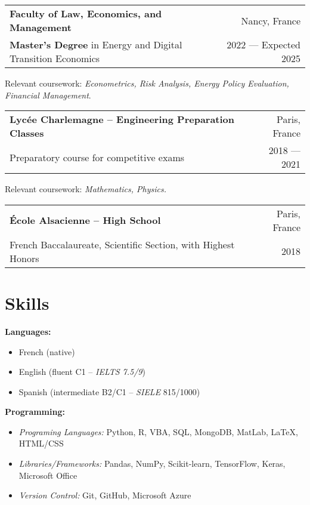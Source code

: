 \documentclass[a4paper,9pt]{extarticle}
\begin{document}
\vspace{7pt} %
\noindent
\begin{tabularx}{\textwidth}{@{}Xr@{}}
\textbf{Faculty of Law, Economics, and Management} & Nancy, France\\
\textbf{Master’s Degree} in Energy and Digital Transition Economics & 2022 — Expected 2025\\
\end{tabularx}
\vspace{-5pt}
Relevant coursework: \textit{Econometrics, Risk Analysis, Energy Policy Evaluation, Financial Management}.

\vspace{7pt} %
\noindent
\begin{tabularx}{\textwidth}{@{}Xr@{}}
\textbf{Lycée Charlemagne -- Engineering Preparation Classes} & Paris, France\\
Preparatory course for competitive exams & 2018 — 2021\\
\end{tabularx}
\vspace{-5pt}
Relevant coursework: \textit{Mathematics, Physics.}

\vspace{7pt} %
\noindent
\begin{tabularx}{\textwidth}{@{}Xr@{}}
\textbf{École Alsacienne -- High School} & Paris, France\\
French Baccalaureate, Scientific Section, with Highest Honors & 2018\\
\end{tabularx}

\section*{Skills}
\noindent
\begin{minipage}[t]{0.45\textwidth} %
    \textbf{Languages:}
    \begin{itemize}
        \item French (native)
        \item English (fluent C1 -- \textit{IELTS 7.5/9})
        \item Spanish (intermediate B2/C1 -- \textit{SIELE} 815/1000)
    \end{itemize}
\end{minipage}%
\hfill %
\begin{minipage}[t]{0.45\textwidth} %
    \textbf{Programming:}
    \begin{itemize}
        \item \textit{Programing Languages:} Python, R, VBA, SQL, MongoDB, MatLab, LaTeX, HTML/CSS
        \item \textit{Libraries/Frameworks:} Pandas, NumPy, Scikit-learn, TensorFlow, Keras, Microsoft Office
        \item \textit{Version Control:} Git, GitHub, Microsoft Azure
    \end{itemize}
\end{minipage}
\end{document}
